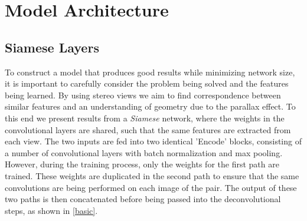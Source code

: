 \documentclass[ %
                    author={Gavin Parker},
                supervisor={Dr. Neill Campbell},
                    degree={MEng},
                     title={Deep Siamese Networks for Illumination Estimation from Stereo Images},
                  subtitle={},
                      type={Research},
                      year={2018} ]{dissertation}
\begin{document}
\section{Model Architecture}
\subsection{Siamese Layers}
To construct a model that produces good results while minimizing network size, it is important to carefully consider the problem being solved and the features being learned. By using stereo views we aim to find correspondence between similar features and an understanding of geometry due to the parallax effect. To this end we present results from a \textit{Siamese} network, where the weights in the convolutional layers are shared, such that the same features are extracted from each view. The two inputs are fed into two identical 'Encode' blocks, consisting of a number of convolutional layers with batch normalization and max pooling. However, during the training process, only the weights for the first path are trained. These weights are duplicated in the second path to ensure that the same convolutions are being performed on each image of the pair. The output of these two paths is then concatenated before being passed into the deconvolutional steps, as shown in \ref{basic}.
\newline
\end{document}
